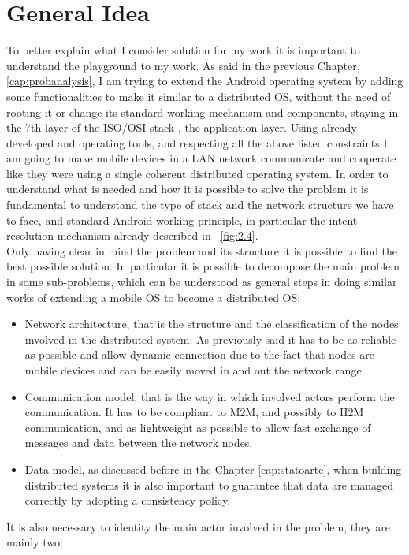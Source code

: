\section{General Idea}
\par To better explain what I consider solution for my work it is important to
understand the playground to my work. As said in the previous Chapter, \ref{cap:probanalysis}, I
am trying to extend the Android operating system by adding some functionalities to make it similar to a distributed OS, without the need of rooting it or change its standard working mechanism and components, staying in the 7th layer of the ISO/OSI stack , the application layer. Using already developed and operating tools, and respecting all the above listed constraints I am going to make mobile devices in a LAN network communicate and cooperate like they were using a single coherent distributed operating system.
In order to understand what is needed and how it is possible to solve the problem
it is fundamental to understand the type of stack and the network structure
we have to face, and standard Android working principle, in particular the intent resolution mechanism already described in \figurename~\ref{fig:2.4}.\\
Only having clear in mind the problem and its structure it is possible to find the best possible solution. In particular it is possible to decompose the main problem in some sub-problems, which can be understood as general steps in doing similar works of extending a mobile OS to become a distributed OS:
\begin{itemize}
	\item Network architecture, that is the structure and the classification of the nodes involved in the distributed system. As previously said it has to be as reliable  as possible and allow dynamic connection due to the fact that nodes are mobile devices and can be easily moved in and out the network range.
	\item Communication model, that is the way in which involved actors perform the communication. It has to be compliant to M2M, and possibly to H2M communication, and as lightweight as possible to allow fast exchange of messages and data between the network nodes.
	\item Data model, as discussed before in the Chapter \ref{cap:statoarte}, when building distributed systems it is also important to guarantee that data are managed correctly by adopting a consistency policy.
\end{itemize}
It is also necessary to identity the main actor involved in the problem, they are mainly two:
